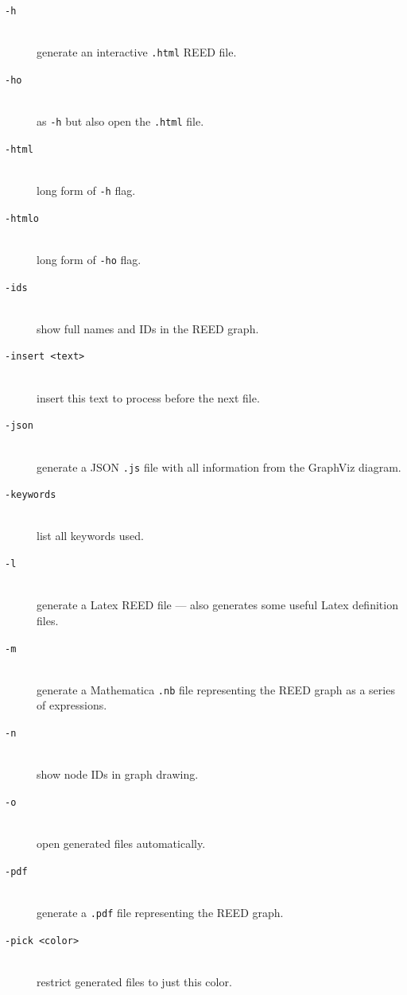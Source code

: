 \begin{description}
\item[\tt -h]~\\ generate an interactive \texttt{.html} REED file.

\item[\tt -ho]~\\ as \texttt{-h} but also open the \texttt{.html} file.

\item[\tt -html]~\\ long form of \texttt{-h} flag.

\item[\tt -htmlo]~\\ long form of \texttt{-ho} flag.

\item[\tt -ids]~\\ show full names and IDs in the REED graph.

\item[\tt -insert <text>]~\\ insert this text to process before the next file.

\item[\tt -json]~\\ generate a JSON \texttt{.js} file with all information from the GraphViz diagram.

\item[\tt -keywords]~\\ list all keywords used.

\item[\tt -l]~\\ generate a Latex REED file --- also generates some useful Latex definition files.

\item[\tt -m]~\\ generate a Mathematica \texttt{.nb} file representing the REED graph as a series of expressions.

\item[\tt -n]~\\ show node IDs in graph drawing.

\item[\tt -o]~\\ open generated files automatically.

\item[\tt -pdf]~\\ generate a \texttt{.pdf} file representing the REED graph.

\item[\tt -pick <color>]~\\ restrict generated files to just this color.


\end{description}

